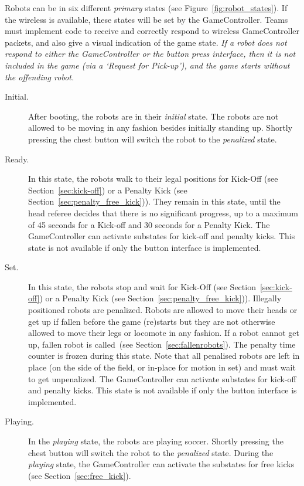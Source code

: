 \documentclass[12pt]{article}
\newcommand{\cf}{see\xspace}
\newcommand{\KickOffAutoTime}{45 seconds\xspace}
\newcommand{\PenaltyFreeKickSetupTime}{30 seconds\xspace}
\begin{document}
Robots can be in six different \emph{primary} states (\cf Figure~\ref{fig:robot_states}). If the wireless is available, these states will be set by the GameController. Teams must implement code to receive and correctly respond to wireless GameController packets, and also give a visual indication of the game state.
\emph{If a robot does not respond to either the GameController or the button press interface, then it is not included in the game (via a `Request for Pick-up'), and the game starts without the offending robot.}

\begin{description}

\item[Initial.] After booting, the robots are in their \emph{initial} state. The robots are not allowed to be moving in any fashion besides initially standing up. Shortly pressing the chest button will switch the robot to the \emph{penalized} state.

\item[Ready.] In this state, the robots walk to their legal positions for Kick-Off  (\cf Section~\ref{sec:kick-off}) or a Penalty Kick (\cf Section~\ref{sec:penalty_free_kick})). They remain in this state, until the head referee decides that there is no significant progress, up to a maximum of \KickOffAutoTime for a Kick-off and \PenaltyFreeKickSetupTime for a Penalty Kick.
The GameController can activate substates for kick-off and penalty kicks.
This state is not available if only the button interface is implemented.

\item[Set.] In this state, the robots stop and wait for Kick-Off  (\cf Section~\ref{sec:kick-off}) or a Penalty Kick (\cf Section~\ref{sec:penalty_free_kick})).
Illegally positioned robots are penalized.
Robots are allowed to move their heads or get up if fallen before the game (re)starts but they are not otherwise allowed to move their legs or locomote in any fashion.
If a robot cannot get up, fallen robot is called~(\cf Section~\ref{sec:fallenrobots}).
The penalty time counter is frozen during this state.
Note that all penalised robots are left in place (on the side of the field, or in-place for motion in set) and must wait to get unpenalized.
The GameController can activate substates for kick-off and penalty kicks.
This state is not available if only the button interface is implemented.

\item[Playing.] In the \emph{playing} state, the robots are playing soccer. Shortly pressing the chest button will switch the robot to the \emph{penalized} state. During the \emph{playing} state, the GameController can activate the substates for free kicks (\cf Section~\ref{sec:free_kick}).


\end{description}
\end{document}
